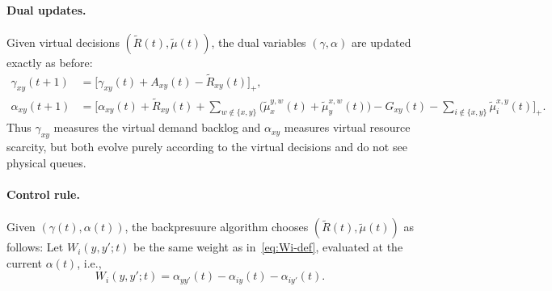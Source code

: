 \documentclass[11pt]{article}
\begin{document}
\paragraph{Dual updates.}
Given virtual decisions $(\tilde R(t),\tilde\mu(t))$, the dual variables $(\gamma,\alpha)$ are updated exactly as before:
\begin{align}
\gamma_{xy}(t{+}1)
& = \bigl[\gamma_{xy}(t) + A_{xy}(t) - \tilde R_{xy}(t)\bigr]_+,
\label{eq:virt-gamma-update}\\[1mm]
\alpha_{xy}(t{+}1)
&= \bigl[\alpha_{xy}(t) + \tilde R_{xy}(t)
+ \sum_{w\notin\{x,y\}} \bigl(\tilde\mu_x^{y,w}(t)+\tilde\mu_y^{x,w}(t)\bigr)
- G_{xy}(t)
- \sum_{i\notin\{x,y\}}\tilde\mu_i^{x,y}(t)\bigr]_+.
\label{eq:virt-alpha-update}
\end{align}
Thus $\gamma_{xy}$ measures the virtual demand backlog and $\alpha_{xy}$ measures virtual
resource scarcity, but both evolve purely according to the virtual decisions and do not see
physical queues.

\paragraph{Control rule.}
Given $(\gamma(t),\alpha(t))$, the backpresuure algorithm chooses $(\tilde R(t),\tilde\mu(t))$ as follows:
Let $W_i(y,y';t)$ be the same weight as in~\eqref{eq:Wi-def}, evaluated at the current
$\alpha(t)$, i.e.,
\[
W_i(y,y';t)
= \alpha_{yy'}(t) - \alpha_{iy}(t) - \alpha_{iy'}(t).
\]
\end{document}
